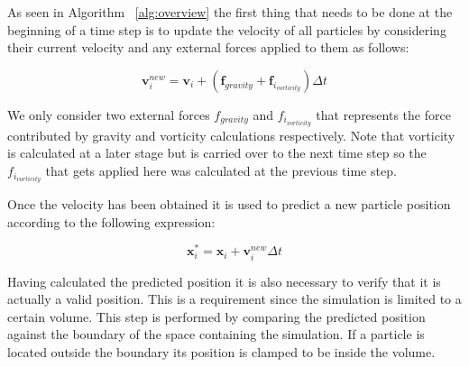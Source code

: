 As seen in Algorithm ~\ref{alg:overview} the first thing that needs to be done at the beginning of a time step is to update the velocity of all particles by
considering their current velocity and any external forces applied to them as follows:

\begin{equation}
\label{eq:velocity}
\mathbf{v}_{i}^{new} = \mathbf{v}_{i} + (\mathbf{f}_{gravity} + \mathbf{f}_{i_{vorticity}})\Delta t
\end{equation}

We only consider two external forces $ f_{gravity} $ and $ f_{i_{vorticity}} $
that represents the force contributed by gravity and vorticity calculations
respectively. Note that vorticity is calculated at a later stage but is carried
over to the next time step so the $ f_{i_{vorticity}} $ that gets applied here
was calculated at the previous time step.

Once the velocity has been obtained it is used to predict a new particle
position according to the following expression:

\begin{equation}
\label{eq:predict}
\mathbf{x}_{i}^{*}= \mathbf{x}_{i} + \mathbf{v}_{i}^{new} \Delta t
\end{equation}

Having calculated the predicted position it is also necessary to verify that it
is actually a valid position. This is a requirement since the simulation is
limited to a certain volume. This step is performed by comparing the predicted
position against the boundary of the space containing the simulation. If a
particle is located outside the boundary its position is clamped to be inside
the volume.
